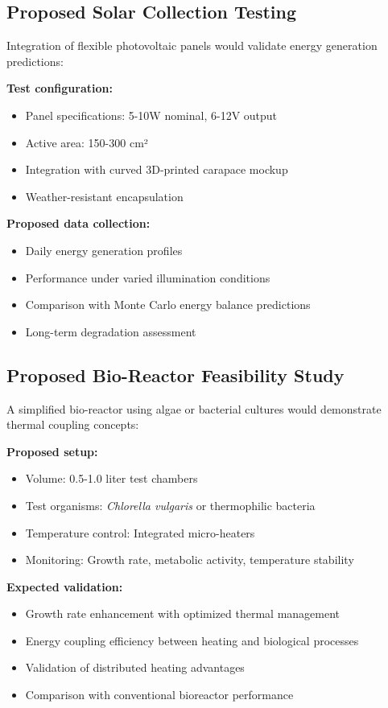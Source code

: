 \subsection{Proposed Solar Collection Testing}

Integration of flexible photovoltaic panels would validate energy generation predictions:

\textbf{Test configuration:}
\begin{itemize}
    \item Panel specifications: 5-10W nominal, 6-12V output
    \item Active area: 150-300 cm²
    \item Integration with curved 3D-printed carapace mockup
    \item Weather-resistant encapsulation
\end{itemize}

\textbf{Proposed data collection:}
\begin{itemize}
    \item Daily energy generation profiles
    \item Performance under varied illumination conditions
    \item Comparison with Monte Carlo energy balance predictions
    \item Long-term degradation assessment
\end{itemize}

\subsection{Proposed Bio-Reactor Feasibility Study}

A simplified bio-reactor using algae or bacterial cultures would demonstrate thermal coupling concepts:

\textbf{Proposed setup:}
\begin{itemize}
    \item Volume: 0.5-1.0 liter test chambers
    \item Test organisms: \textit{Chlorella vulgaris} or thermophilic bacteria
    \item Temperature control: Integrated micro-heaters
    \item Monitoring: Growth rate, metabolic activity, temperature stability
\end{itemize}

\textbf{Expected validation:}
\begin{itemize}
    \item Growth rate enhancement with optimized thermal management
    \item Energy coupling efficiency between heating and biological processes
    \item Validation of distributed heating advantages
    \item Comparison with conventional bioreactor performance
\end{itemize}

